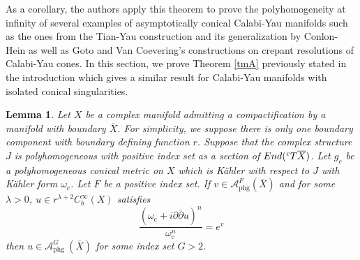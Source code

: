 \documentclass[a4paper,11pt]{article}
\newcounter{mythm}[section]
\newtheorem{lm}[mythm]{Lemma}
\begin{document}
As a corollary, the authors apply this theorem to prove the polyhomogeneity at infinity of several examples of asymptotically conical Calabi-Yau manifolds such as the ones from the Tian-Yau \cite{TianYau2} construction and its generalization by Conlon-Hein \cite{conlon2015asymptotically} as well as Goto and Van Coevering's constructions \cite{goto_calabi-yau_2012, van_coevering_ricci-flat_2010} on crepant resolutions of Calabi-Yau cones. In this section, we prove Theorem \ref{tmA} previously stated in the introduction which gives a similar result for Calabi-Yau manifolds with isolated conical singularities.
\begin{lm} \label{tmphg}
Let $X$ be a complex manifold admitting a compactification by a manifold with boundary $\overline{X}$. For simplicity, we suppose there is only one boundary component with boundary defining function $r$. Suppose that the complex structure $J$ is polyhomogeneous with positive index set as a section of $End( \hspace{0.01cm} ^{c}T \overline{X})$. Let $g_c$ be a polyhomogeneous conical metric on $X$ which is Kähler with respect to $J$ with Kähler form $\omega_c$. Let $F$ be a positive index set. If $v \in \mathcal{A}_{\mathrm{phg}}^F(\overline{X})$ and for some $\lambda>0$, $u \in r^{\lambda + 2} C_b^{\infty}(X)$ satisfies
$$
\frac{\left(\omega_{\mathrm{c}}+i \partial \bar{\partial} u\right)^n}{\omega_{\mathrm{c}}^n}=e^v
$$
then $u \in \mathcal{A}_{\text {phg }}^{G}\left(\overline{X}\right)$ for some index set $G > 2$.
\end{lm}
\end{document}
